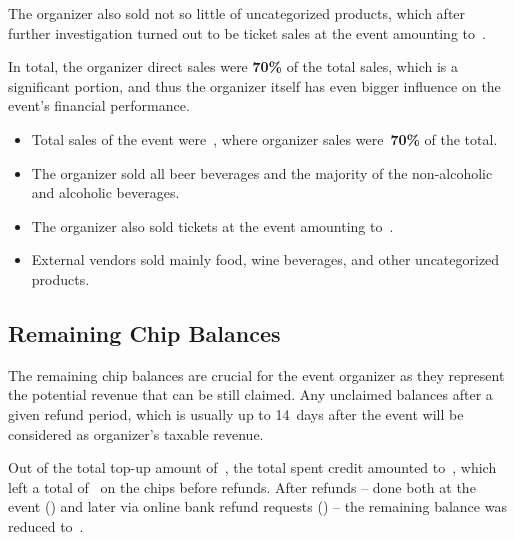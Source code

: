 The organizer also sold not so little of uncategorized products, which after further investigation turned out to be ticket sales at the event amounting to~.

In total, the organizer direct sales were \textbf{70\%} of the total sales, which is a significant portion, and thus the organizer itself has even bigger influence on the event's financial performance.

\begin{keytakeaways}
	\begin{itemize}
		\item Total sales of the event were~, where organizer sales were~\textbf{70\%} of the total.
		\item The organizer sold all beer beverages and the majority of the non-alcoholic and alcoholic beverages.
		\item The organizer also sold tickets at the event amounting to~.
		\item External vendors sold mainly food, wine beverages, and other uncategorized products.
	\end{itemize}
\end{keytakeaways}



\subsection{Remaining Chip Balances}
\label{subsec:analysis-remaining-balances}
\begin{rqbox}
	\textit{}
\end{rqbox}

The remaining chip balances are crucial for the event organizer as they represent the potential revenue that can be still claimed.
Any unclaimed balances after a given refund period, which is usually up to 14~days after the event will be considered as organizer's taxable revenue.

Out of the total top-up amount of~, the total spent credit amounted to~, which left a total of~ on the chips before refunds.
After refunds – done both at the event () and later via online bank refund requests () – the remaining balance was reduced to~.

